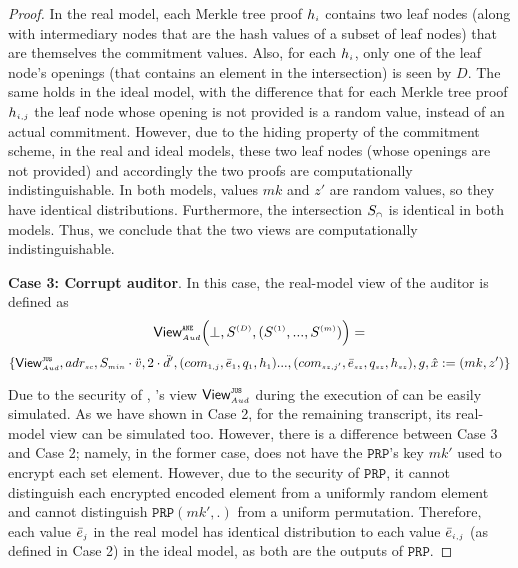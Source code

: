 \begin{proof}
 
 
 
 In the real model, each Merkle tree proof $h_{\scriptscriptstyle i}$ contains two leaf nodes (along with intermediary nodes that are the hash values of a subset of leaf nodes) that are themselves the commitment values. Also, for each $h_{\scriptscriptstyle i}$, only one of the leaf node's openings (that contains an element in the intersection) is seen by $D$. The same holds in the ideal model, with the difference that for each Merkle tree proof $h_{\scriptscriptstyle i, j}$ the leaf node whose opening is not provided is a random value, instead of an actual commitment. However, due to the hiding property of the commitment scheme, in the real and ideal models,  these two leaf nodes (whose openings are not provided) and accordingly the two proofs are computationally indistinguishable. In both models, values $mk$ and $z'$ are random values, so they have identical distributions. Furthermore, the intersection $S_{\scriptscriptstyle \cap}$ is identical in both models. Thus, we conclude that the two views are computationally indistinguishable.
 
 
 

\noindent\textbf{Case 3: Corrupt auditor}.  In this case, the real-model view of the auditor is defined as  
%
$$ \mathsf{View}_{\scriptscriptstyle Aud}^{\scriptscriptstyle \mathtt{ANE}} \Big(\bot, S^{\scriptscriptstyle (D)}, (S^{\scriptscriptstyle (1)},..., S^{\scriptscriptstyle (m)})\Big)=$$
%
$$ \{\mathsf{View}^{\scriptscriptstyle \mathtt{JUS}}_{\scriptscriptstyle Aud}, adr_{\scriptscriptstyle sc}, S_{\scriptscriptstyle min}\cdot \ddot{v}, 2\cdot \ddot{d}', (com_{\scriptscriptstyle 1,j}, \bar{e}_{\scriptscriptstyle 1}, q_{\scriptscriptstyle 1}, h_{\scriptscriptstyle 1})..., (com_{\scriptscriptstyle sz, j'}, \bar{e}_{\scriptscriptstyle sz}, q_{\scriptscriptstyle {sz}}, h_{\scriptscriptstyle sz}), g, \hat{x}:=({mk}, z')\}$$


  Due to the security of \fpsi, \aud's view $\mathsf{View}^{\scriptscriptstyle \mathtt{JUS}}_{\scriptscriptstyle Aud}$ during the execution of \fpsi can be easily simulated. As we have shown in Case 2, for the remaining transcript, its real-model view can be simulated too. However, there is a difference between Case 3 and Case 2; namely, in the former case, \aud does not have the $\mathtt{PRP}$'s key $mk'$ used to encrypt each set element. However, due to the security of  $\mathtt{PRP}$, it cannot distinguish each encrypted encoded element from a uniformly random element and cannot distinguish $\mathtt{PRP}(mk',.)$ from a uniform permutation. Therefore, each value $\bar{e}_{\scriptscriptstyle j}$ in the real model has identical distribution to each value $\bar{e}_{\scriptscriptstyle i,j}$ (as defined in Case 2) in the ideal model, as both are the outputs of $\mathtt{PRP}$. 





\end{proof}
